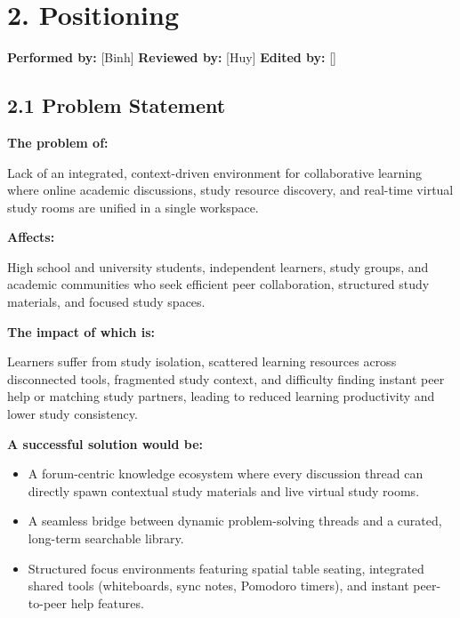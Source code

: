 \documentclass[12pt]{article}
\begin{document}
\section*{2. Positioning}
\par\medskip
\textbf{\textbf{Performed by:}} [Binh] \textbar{} \textbf{\textbf{Reviewed by:}} [Huy] \textbar{} \textbf{\textbf{Edited by:}} []
\par\medskip
\hypertarget{sec:21-problem-statement}{}
\subsection*{2.1 Problem Statement}
\par\medskip
\textbf{The problem of:}
\par\medskip
Lack of an integrated, context-driven environment for collaborative learning where online academic discussions, study resource discovery, and real-time virtual study rooms are unified in a single workspace.
\par\medskip
\textbf{Affects:}
\par\medskip
High school and university students, independent learners, study groups, and academic communities who seek efficient peer collaboration, structured study materials, and focused study spaces.
\par\medskip
\textbf{The impact of which is:}
\par\medskip
Learners suffer from study isolation, scattered learning resources across disconnected tools, fragmented study context, and difficulty finding instant peer help or matching study partners, leading to reduced learning productivity and lower study consistency.
\par\medskip
\textbf{A successful solution would be:}
\par\medskip
\begin{itemize}
\item A forum-centric knowledge ecosystem where every discussion thread can directly spawn contextual study materials and live virtual study rooms.
\par
\item A seamless bridge between dynamic problem-solving threads and a curated, long-term searchable library.
\par
\item Structured focus environments featuring spatial table seating, integrated shared tools (whiteboards, sync notes, Pomodoro timers), and instant peer-to-peer help features.
\par
\end{itemize}
\hypertarget{sec:22-product-position-statement}{}
\end{document}
